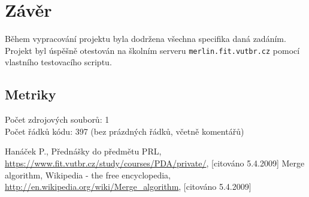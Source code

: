 \documentclass[11pt,a4paper]{article}
\begin{document}
\section{Závěr}

Během vypracování projektu byla dodržena všechna specifika daná zadáním.
Projekt byl úspěšně otestován na školním serveru \texttt{merlin.fit.vutbr.cz}
pomocí vlastního testovacího scriptu.

\subsection*{Metriky}

\noindent
Počet zdrojových souborů: 1 \\
Počet řádků kódu: 397 (bez prázdných řádků, včetně komentářů)

\begin{thebibliography}{77}
\small
{} Hanáček P., Přednášky do předmětu PRL, \url{https://www.fit.vutbr.cz/study/courses/PDA/private/}, [citováno 5.4.2009]
 Merge algorithm, Wikipedia - the free encyclopedia, \url{http://en.wikipedia.org/wiki/Merge_algorithm}, [citováno 5.4.2009]
\end{thebibliography}
\end{document}
